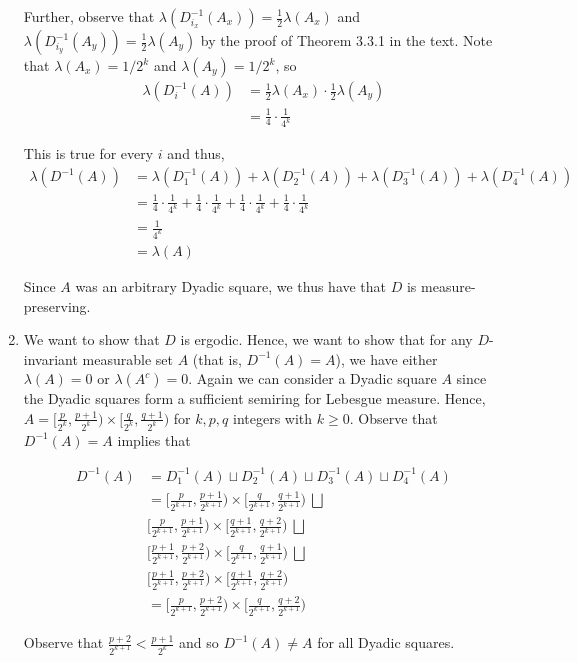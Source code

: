 \documentclass[12pt]{article}
\begin{document}
\begin{enumerate}[label=\alph*)]
Further, observe that $\lambda(D_{i_x}^{-1}(A_x)) = \frac{1}{2} \lambda(A_x)$ and $\lambda(D_{i_y}^{-1}(A_y)) = \frac{1}{2} \lambda(A_y)$ by the proof of Theorem 3.3.1 in the text. Note that $\lambda(A_x) = 1/2^k$ and $\lambda(A_y) = 1/2^k$, so
\begin{align*}
\lambda(D_i^{-1}(A)) &= \frac{1}{2} \lambda(A_x) \cdot \frac{1}{2} \lambda(A_y)\\
&= \frac{1}{4} \cdot \frac{1}{4^k}
\end{align*}

This is true for every $i$ and thus,
\begin{align*}
\lambda(D^{-1}(A)) &= \lambda(D_1^{-1}(A)) + \lambda(D_2^{-1}(A)) + \lambda(D_3^{-1}(A)) + \lambda(D_4^{-1}(A))\\
&= \frac{1}{4} \cdot \frac{1}{4^k} + \frac{1}{4} \cdot \frac{1}{4^k} +  \frac{1}{4} \cdot \frac{1}{4^k} + \frac{1}{4} \cdot \frac{1}{4^k}\\
&= \frac{1}{4^k}\\
&= \lambda(A)
\end{align*}

Since $A$ was an arbitrary Dyadic square, we thus have that $D$ is measure-preserving.

\item We want to show that $D$ is ergodic. Hence, we want to show that for any $D$-invariant measurable set $A$ (that is, $D^{-1}(A) = A$), we have either $\lambda(A) = 0$ or $\lambda(A^c) = 0$. Again we can consider a Dyadic square $A$ since the Dyadic squares form a sufficient semiring for Lebesgue measure. Hence, $A = [\frac{p}{2^k}, \frac{p+1}{2^k}) \times [\frac{q}{2^k}, \frac{q+1}{2^k})$ for $k, p, q$ integers with $k \geq 0$. Observe that $D^{-1}(A) = A$ implies that

\begin{align*}
D^{-1}(A) &= D_1^{-1}(A) \sqcup D_2^{-1}(A) \sqcup D_3^{-1}(A) \sqcup D_4^{-1}(A)\\
&= [\frac{p}{2^{k+1}}, \frac{p+1}{2^{k+1}}) \times [\frac{q}{2^{k+1}}, \frac{q+1}{2^{k+1}}) \ \bigsqcup \\
&[\frac{p}{2^{k+1}}, \frac{p+1}{2^{k+1}}) \times [\frac{q+1}{2^{k+1}}, \frac{q+2}{2^{k+1}}) \ \bigsqcup \\
&[\frac{p+1}{2^{k+1}}, \frac{p+2}{2^{k+1}}) \times [\frac{q}{2^{k+1}}, \frac{q+1}{2^{k+1}}) \ \bigsqcup \\
&[\frac{p+1}{2^{k+1}}, \frac{p+2}{2^{k+1}}) \times [\frac{q+1}{2^{k+1}}, \frac{q+2}{2^{k+1}}) \\
&= [\frac{p}{2^{k+1}}, \frac{p+2}{2^{k+1}}) \times [\frac{q}{2^{k+1}}, \frac{q+2}{2^{k+1}}) 
\end{align*}

Observe that $\frac{p+2}{2^{k+1}} < \frac{p+1}{2^k}$ and so $D^{-1}(A) \neq A$ for all Dyadic squares.

\end{enumerate}
\end{document}
